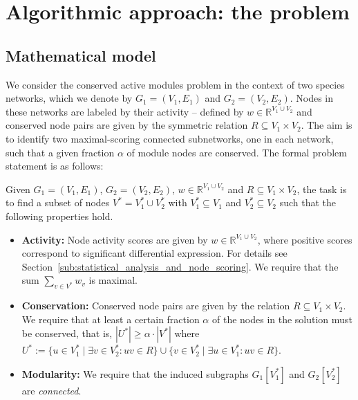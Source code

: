 \section{Algorithmic approach: the \mwccs{} problem}
\label{sec:mip}

	\subsection{Mathematical model}

		We consider the conserved active modules problem in the context of two species networks, which we denote by $G_1 = (V_1, E_1)$ and $G_2 = (V_2, E_2)$.
		Nodes in these networks are labeled by their activity -- defined by $w \in \mathbb{R}^{V_1 \cup V_2}$ and conserved node pairs are given by the symmetric relation $R \subseteq V_1 \times V_2$. The aim is to identify two maximal-scoring connected subnetworks, one in each network, such that a given fraction $\alpha$ of module nodes are conserved.
		The formal problem statement is as follows:

		\begin{problem}
  	  	  Given $G_1=(V_1,E_1)$, $G_2 = (V_2,E_2)$, $w \in \mathbb{R}^{V_1 \cup V_2}$ and $R \subseteq V_1 \times V_2$, the task is to find a subset of nodes $V^* = V^*_1 \cup V^*_2$ with 
		$V^*_1 \subseteq V_1$ and $V^*_2 \subseteq V_2$ such that the following 
		properties hold.
		\begin{itemize}
		\item \textbf{Activity:}
  	  	  Node activity scores are given by $w \in
    	 	 \mathbb{R}^{V_1 \cup V_2}$, where positive scores correspond to
    	 	 significant differential expression. For details see Section~\ref{sub:statistical_analysis_and_node_scoring}.
		We require that the sum $\sum_{v \in V^*} w_v$ is maximal.
		\item \textbf{Conservation:}
  	  	  Conserved node pairs are given by the relation $R
    	 	 \subseteq V_1 \times V_2$. We require that at least a certain fraction $\alpha$ of the nodes in the solution must be
  	  	  conserved, that is, $|U^*| \geq \alpha \cdot |V^*|$ where $U^* := \{u \in V_1^*
  	  	  \mid \exists v \in V_2^*: uv \in R\} \cup \{v \in V_2^*
  	  	  \mid \exists u \in V_1^*: uv \in R\}$.
		\item  \textbf{Modularity:}
  	  	  We require that the induced subgraphs $G_1[V^*_1]$ and $G_2[V^*_2]$ are \emph{connected}.
		\end{itemize}
		\end{problem}


